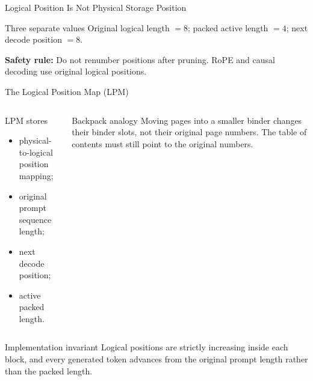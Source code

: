 \documentclass[aspectratio=169,10pt]{beamer}
\newcommand{\safetylabel}{\textbf{Safety rule:}}
\newcommand{\tightitems}{\setlength{\itemsep}{0.28em}\setlength{\parskip}{0pt}}
\begin{document}
\begin{frame}{Logical Position Is Not Physical Storage Position}
\small
\begin{center}
\end{center}
\begin{block}{Three separate values}
Original logical length $=8$; packed active length $=4$; next decode position $=8$.
\end{block}
\begin{alertblock}{\safetylabel}
Do not renumber positions after pruning. RoPE and causal decoding use original logical positions.
\end{alertblock}
\end{frame}

\begin{frame}{The Logical Position Map (LPM)}
\small
\begin{columns}[T,onlytextwidth]
\begin{block}{LPM stores}
\begin{itemize}\tightitems
  \item physical-to-logical position mapping;
  \item original prompt sequence length;
  \item next decode position;
  \item active packed length.
\end{itemize}
\end{block}
\begin{exampleblock}{Backpack analogy}
Moving pages into a smaller binder changes their binder slots, not their original page numbers.
The table of contents must still point to the original numbers.
\end{exampleblock}
\end{columns}
\vspace{0.55em}
\begin{alertblock}{Implementation invariant}
Logical positions are strictly increasing inside each block, and every generated token advances
from the original prompt length rather than the packed length.
\end{alertblock}
\end{frame}
\end{document}
